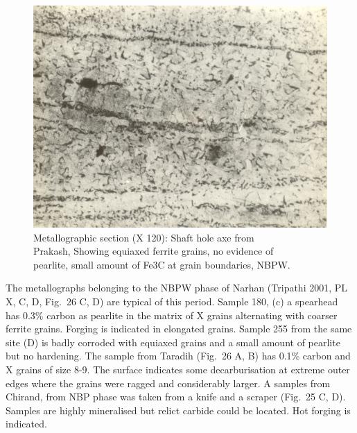 \newpage


\begin{figure}[H]
\renewcommand{\thefigure}{23B}
\includegraphics[scale=0.75]{images/chapter-4/fig023B.jpg}
\caption{Metallographic section (X 120): Shaft hole axe from\\ Prakash, Showing equiaxed ferrite grains, no evidence of\\ pearlite, small amount of Fe3C at grain boundaries, NBPW.}\label{chapter-4-fig23B}
\end{figure}



\vspace{-.3cm}

The metallographs belonging to the NBPW phase of Narhan (Tripathi 2001, PL X, C, D, Fig.~26 C, D) are typical of this period. Sample 180, (c) a spearhead has 0.3\% carbon as pearlite in the matrix of X grains alternating with coarser ferrite grains. Forging is indicated in elongated grains. Sample 255 from the same site (D) is badly corroded with equiaxed grains and a small amount of pearlite but no hardening. The sample from Taradih (Fig.~26 A, B) has 0.1\% carbon and X grains of size 8-9. The surface indicates some decarburisation at extreme outer edges where the grains were ragged and considerably larger. A samples from Chirand, from NBP phase was taken from a knife and a scraper (Fig.~25 C, D). Samples are highly mineralised but relict carbide could be located. Hot forging is indicated.

